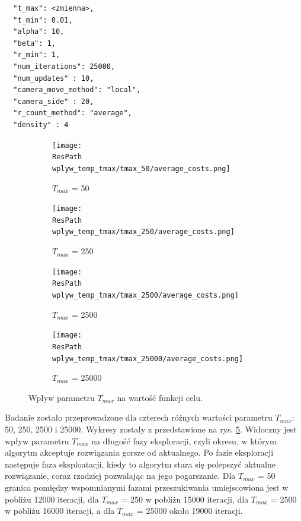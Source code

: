 \documentclass[12pt,a4paper]{article}
\newcommand{\ResPath}{../badania/}
\begin{document}
\begin{lstlisting}
  "t_max": <zmienna>,
  "t_min": 0.01,
  "alpha": 10,
  "beta": 1,
  "r_min": 1,
  "num_iterations": 25000,
  "num_updates" : 10,
  "camera_move_method": "local",
  "camera_side" : 20,
  "r_count_method": "average",
  "density" : 4
\end{lstlisting}
\afterpage{\clearpage}
\begin{figure}[p]
  \begin{subfigure}[b]{0.5\linewidth}
    \centering
    \texttt{[image: \\ResPath wplyw\_temp\_tmax/tmax\_50/average\_costs.png]} 
    \caption{$T_{max}$ = 50} 
    \label{fig_tmax:a} 
    \vspace{2ex}
  \end{subfigure}%
  \begin{subfigure}[b]{0.5\linewidth}
    \texttt{[image: \\ResPath wplyw\_temp\_tmax/tmax\_250/average\_costs.png]} 
    \caption{$T_{max}$ = 250} 
    \label{fig_tmax:b} 
    \vspace{2ex}
  \end{subfigure} 
  \begin{subfigure}[b]{0.5\linewidth}
    \centering
    \texttt{[image: \\ResPath wplyw\_temp\_tmax/tmax\_2500/average\_costs.png]} 
    \caption{$T_{max}$ = 2500} 
    \label{fig_tmax:c} 
  \end{subfigure}%
  \begin{subfigure}[b]{0.5\linewidth}
    \centering
    \texttt{[image: \\ResPath wplyw\_temp\_tmax/tmax\_25000/average\_costs.png]} 
    \caption{$T_{max}$ = 25000} 
    \label{fig_tmax:d} 
  \end{subfigure} 
  \caption{Wpływ parametru $T_{max}$ na wartość funkcji celu.}
  \label{fig_tmax} 
\end{figure}
\restoregeometry

Badanie zostało przeprowadzone dla czterech różnych wartości parametru $T_{max}$:
50, 250, 2500 i 25000. Wykresy zostały z przedstawione na rys. \ref{fig_tmax}.
Widoczny jest wpływ parametru $T_{max}$ na długość fazy eksploracji, czyli okresu,
w którym algorytm akceptuje rozwiązania gorsze od aktualnego. Po fazie eksploracji
następuje faza eksploatacji, kiedy to algorytm stara się polepszyć aktualne rozwiązanie,
coraz rzadziej pozwalając na jego pogarszanie. Dla $T_{max}$ = 50
granica pomiędzy wspomnianymi fazami przeszukiwania umiejscowiona jest w pobliżu
12000 iteracji, dla $T_{max}$ = 250 w pobliżu 15000 iteracji, dla $T_{max}$ = 2500
w pobliżu 16000 iteracji, a dla $T_{max}$ = 25000 około 19000 iteracji.
\end{document}

